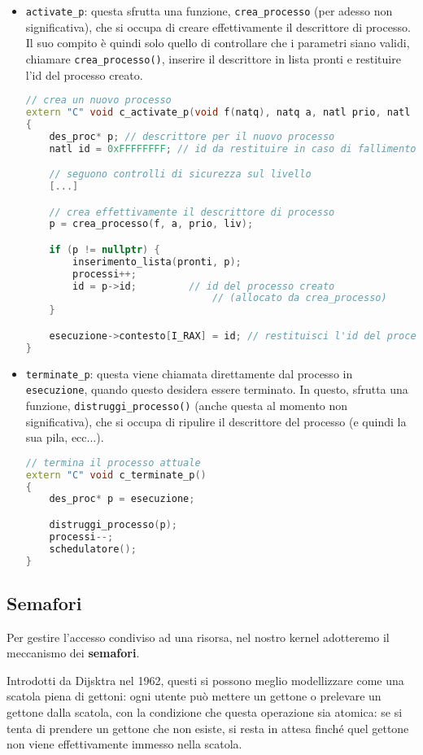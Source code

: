\documentclass[a4paper,11pt]{article}
\begin{document}
\begin{itemize}
	\item \lstinline|activate_p|: questa sfrutta una funzione, \lstinline|crea_processo| (per adesso non significativa), che si occupa di creare effettivamente il descrittore di processo.
		Il suo compito è quindi solo quello di controllare che i parametri siano validi, chiamare \lstinline|crea_processo()|, inserire il descrittore in lista pronti e restituire l'id del processo creato.
\begin{lstlisting}[language=C++, style=codestyle]	
// crea un nuovo processo
extern "C" void c_activate_p(void f(natq), natq a, natl prio, natl liv)
{
	des_proc* p; // descrittore per il nuovo processo
	natl id = 0xFFFFFFFF; // id da restituire in caso di fallimento

	// seguono controlli di sicurezza sul livello
	[...]

	// crea effettivamente il descrittore di processo
	p = crea_processo(f, a, prio, liv);

	if (p != nullptr) {
		inserimento_lista(pronti, p);
		processi++;
		id = p->id;			// id del processo creato
						        // (allocato da crea_processo)
	}

	esecuzione->contesto[I_RAX] = id; // restituisci l'id del processo
}
\end{lstlisting}
\item \lstinline|terminate_p|: questa viene chiamata direttamente dal processo in \lstinline|esecuzione|, quando questo desidera essere terminato. 
	In questo, sfrutta una funzione, \lstinline|distruggi_processo()| (anche questa al momento non significativa), che si occupa di ripulire il descrittore del processo (e quindi la sua pila, ecc...).
\begin{lstlisting}[language=C++, style=codestyle]	
// termina il processo attuale 
extern "C" void c_terminate_p()
{
	des_proc* p = esecuzione;

	distruggi_processo(p);
	processi--;
	schedulatore();
}
\end{lstlisting}
\end{itemize}

\subsection{Semafori}
Per gestire l'accesso condiviso ad una risorsa, nel nostro kernel adotteremo il meccanismo dei \textbf{semafori}.

Introdotti da Dijsktra nel 1962, questi si possono meglio modellizzare come una scatola piena di gettoni: ogni utente può mettere un gettone o prelevare un gettone dalla scatola, con la condizione che questa operazione sia atomica: se si tenta di prendere un gettone che non esiste, si resta in attesa finché quel gettone non viene effettivamente immesso nella scatola.
\end{document}
